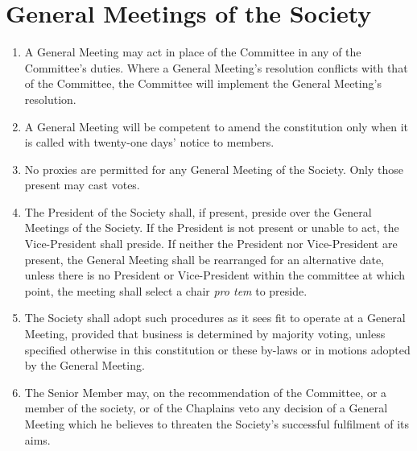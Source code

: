 \documentclass[11pt]{article}
\begin{document}
\section{General Meetings of the Society}
\begin{enumerate}
\item A General Meeting may act in place of the Committee in any of the Committee's duties. Where a General Meeting's resolution conflicts with that of the Committee, the Committee will implement the General Meeting's resolution.
\item A General Meeting will be competent to amend the constitution only when it is called with twenty-one days' notice to members.
\item No proxies are permitted for any General Meeting of the Society. Only those present may cast votes.
\item The President of the Society shall, if present, preside over the General Meetings of the Society. If the President is not present or unable to act, the Vice-President shall preside. If neither the President nor Vice-President are present, the General Meeting shall be rearranged for an alternative date, unless there is no President or Vice-President within the committee at which point, the meeting shall select a chair \emph{pro tem} to preside. 
\item The Society shall adopt such procedures as it sees fit to operate at a General Meeting, provided that business is determined by majority voting, unless specified otherwise in this constitution or these by-laws or in motions adopted by the General Meeting.
\item The Senior Member may, on the recommendation of the Committee, or a member of the society, or of the Chaplains veto any decision of a General Meeting which he believes to threaten the Society's successful fulfilment of its aims.
\end{enumerate}
\end{document}
